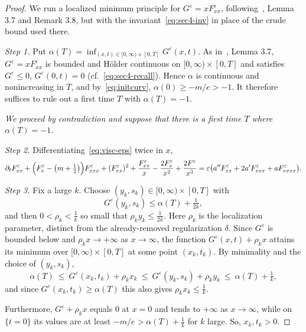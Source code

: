 \documentclass[12pt]{amsart}
\numberwithin{equation}{section}
\theoremstyle{plain}
\theoremstyle{definition}
\newcommand{\eps}{\varepsilon}
\renewcommand{\d}{\partial}
\begin{document}
\begin{proof}
	We run a localized minimum principle for $G^\eps=xF^\eps_{xx}$,
	following~\cite{TV}, Lemma 3.7 and Remark 3.8, but with the
	invariant~\eqref{eq:sec4-inv} in place of the crude bound used there.

	\emph{Step 1.}
	Put $\alpha(T)=\inf_{(x,t)\in[0,\infty)\times[0,T]}G^\eps(x,t)$. As
	in~\cite{TV}, Lemma 3.7, $G^\eps=xF^\eps_{xx}$ is bounded and Hölder
	continuous on $[0,\infty)\times[0,T]$ and satisfies $G^\eps\le0$,
	$G^\eps(0,t)=0$ (cf.~\eqref{eq:sec4-recall}).
	Hence $\alpha$ is continuous and
	nonincreasing in $T$, and by~\eqref{eq:initcurv}, $\alpha(0)\ge-m/e>-1$. It
	therefore suffices to rule out a first time $T$ with $\alpha(T)=-1$.

	\emph{  We proceed by contradiction and suppose that there is a first time
		$T$ where $\alpha(T) = -1$.}

	\emph{Step 2.}
	Differentiating~\eqref{eq:visc-eps} twice in $x$,
	\begin{equation}\label{eq:312}
		\d_tF^\eps_{xx}+\Bigl(F^\eps_x-\bigl(m+\tfrac12\bigr)\Bigr)F^\eps_{xxx}
		+(F^\eps_{xx})^2
		+\frac{F^\eps_{xx}}{x}-\frac{2F^\eps_x}{x^2}+\frac{2F^\eps}{x^3}
		=\eps\bigl(a''F^\eps_{xx}+2a'F^\eps_{xxx}+aF^\eps_{xxxx}\bigr).
	\end{equation}

	\emph{Step 3.}
	Fix a large $k$. Choose $(y_k,s_k)\in[0,\infty)\times[0,T]$ with
	\[
		G^\eps(y_k,s_k)\le\alpha(T)+\tfrac{1}{2k},
	\]
	and then $0<\rho_k<\tfrac1k$ so small that $\rho_k y_k\le\tfrac{1}{2k}$. Here
	$\rho_k$ is the localization parameter, distinct from the already-removed
	regularization $\delta$. Since $G^\eps$ is bounded below and $\rho_k
		x\to+\infty$ as
	$x\to\infty$, the function $G^\eps(x,t)+\rho_k x$ attains its minimum over
	$[0,\infty)\times[0,T]$ at some point $(x_k,t_k)$. By minimality
	and the choice
	of $(y_k,s_k)$,
	\[
		\alpha(T)\ \le\ G^\eps(x_k,t_k)+\rho_k x_k\ \le\ G^\eps(y_k,s_k)+\rho_k y_k
		\ \le\ \alpha(T)+\tfrac1k,
	\]
	and since $G^\eps(x_k,t_k)\ge\alpha(T)$ this also gives $\rho_k
		x_k\le\tfrac1k$.

	Furthermore, $G^\eps+\rho_k x$ equals $0$ at $x=0$ and tends to
	$+\infty$ as
	$x\to\infty$, while on $\{t=0\}$ its values are
	at least $-m/e>\alpha(T)+\tfrac1k$ for
	$k$ large. So, $x_k,t_k>0$.


\end{proof}
\end{document}
